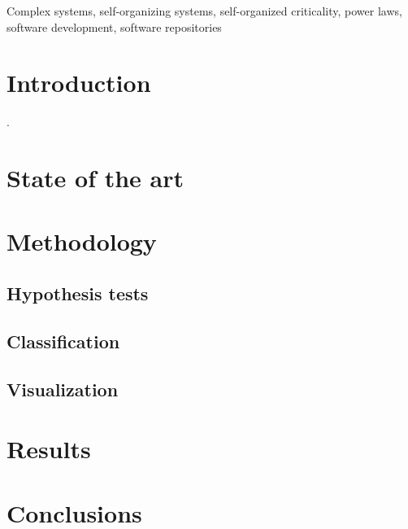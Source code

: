 \documentclass[conference]{IEEEtran}
\begin{document}
\begin{IEEEkeywords}
	Complex systems, self-organizing systems, self-organized criticality, power laws, software development, 
	software repositories
\end{IEEEkeywords}


\section{Introduction}\label{introduction}
. 



\section{State of the art}\label{soa}





\section{Methodology}
\label{sec:method}


\subsection{Hypothesis tests}



\subsection{Classification}

\subsection{Visualization}





\section{Results}
\label{res}




\section{Conclusions}\label{conc}




\end{document}
